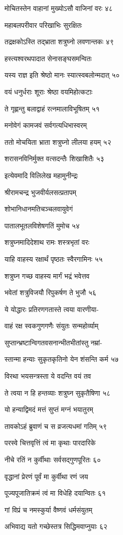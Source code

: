 मोचितस्तेन वाहानां मुख्योऽसौ वाजिनां वरः ४८

महाबलपरीवार परिखाभिः सुरक्षितः

तद्रक्षकोऽस्ति तद्भ्राता शत्रुघ्नो लवणान्तकः ४९

हस्त्यश्वरथपादात सेनासङ्घसमन्वितः

यस्य राज्ञ इति श्रेष्ठो मानः स्यात्स्वबलोन्मदात् ५०

वयं धनुर्धराः शूराः श्रेष्ठा वयमिहोत्कटाः

ते गृह्णन्तु बलाद्वाहं रत्नमालाविभूषितम् ५१

मनोवेगं कामजवं सर्वगत्यधिभास्वरम्

ततो मोचयिता भ्राता शत्रुघ्नो लीलया हयम् ५२

शरासनविनिर्मुक्त वत्सदन्तैः शिखाशितैः ५३

इत्येवमादि विलिलेख महामुनीन्द्रः

श्रीरामचन्द्र भुजवीर्यलसत्प्रतापम्

शोभानिधानमतिचञ्चलवायुवेगं

पातालभूतलविशेषगतिं मुमोच ५४

शत्रुघ्नमादिदेशाथ रामः शस्त्रभृतां वरः

याहि वाहस्य रक्षार्थं पृष्ठतः स्वैरगामिनः ५५

शत्रुघ्न गच्छ वाहस्य मार्गं भद्रं भवेत्तव

भवेतां शत्रुविजयौ रिपुकर्षण ते भुजौ ५६

ये योद्धारः प्रतिरणगतास्ते त्वया वारणीया-

वाहं रक्ष स्वकगुणगणैः संयुतः सन्महोर्व्याम्

सुप्तान्भ्रष्टान्विगतवसनान्भीतभीतांस्तु नम्रां-

स्तान्मा हन्याः सुकृतकृतिनो येन शंसन्ति कर्म ५७

विरथा भयसन्त्रस्ता ये वदन्ति वयं तव

ते त्वया न हि हन्तव्याः शत्रुघ्न सुकृतैषिणा ५८

यो हन्याद्विमदं मत्तं सुप्तं मग्नं भयातुरम्

तावकोऽहं ब्रुवाणं च स व्रजत्यधमां गतिम् ५९

परस्वे चित्तवृत्तिं त्वं मा कृथाः पारदारिके

नीचे रतिं न कुर्वीथाः सर्वसद्गुणपूरितः ६०

वृद्धानां प्रेरणं पूर्वं मा कुर्वीथा रणं जय

पूज्यपूजातिक्रमं त्वं मा विधेहि दयान्वितः ६१

गां विप्रं च नमस्कुर्या वैष्णवं धर्मसंयुतम्

अभिवाद्य यतो गच्छेस्तत्र सिद्धिमवाप्नुयाः ६२

